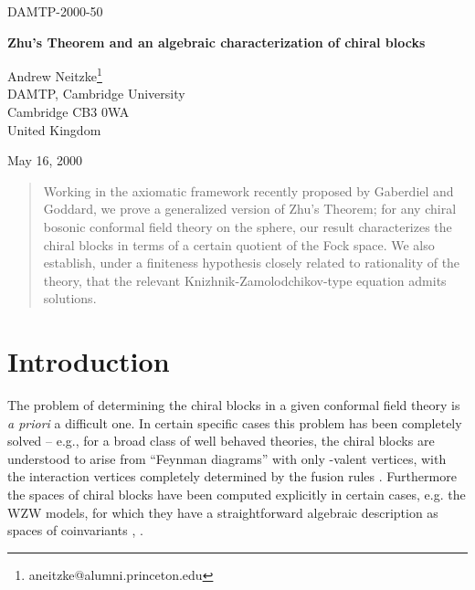 \documentclass[a4paper,12pt]{article}
\providecommand{\ti}[1]{\textit{#1}}
\begin{document}
\begin{flushright}
  DAMTP-2000-50
\end{flushright}

\begin{center} \LARGE{\textbf{Zhu's Theorem and an algebraic characterization of chiral blocks}} \end{center}
\vskip 1.0cm
\begin{center}{\large Andrew Neitzke\footnote{aneitzke@alumni.princeton.edu}\\
DAMTP, Cambridge University\\
Cambridge CB3 0WA\\
United Kingdom\\}\end{center}

\begin{center} May 16, 2000 \end{center}

\vskip 0.8cm


\begin{abstract}

Working in the axiomatic framework recently proposed by Gaberdiel and Goddard, we prove a generalized version
of Zhu's Theorem; for any chiral bosonic conformal field theory on the sphere, our result characterizes 
the chiral blocks in terms of a certain quotient of the Fock space.  We also establish,
under a finiteness hypothesis closely related to rationality of the theory, that the
relevant Knizhnik-Zamolodchikov-type equation admits solutions.

\end{abstract}


\section{Introduction} \label{intro}

The problem of determining the chiral blocks in a given 
conformal field theory is \ti{a priori} a difficult one.  In certain 
specific cases this problem has been
completely solved -- e.g., for a broad class of well behaved theories, the chiral blocks
are understood to arise from ``Feynman diagrams'' with only \coordHE{}-valent vertices, with the
interaction vertices completely determined by the
fusion rules \cite{DFMS}.  Furthermore the spaces of chiral blocks have been computed explicitly
in certain cases, e.g. the WZW models, for which they have a straightforward
algebraic description as spaces of coinvariants \cite{FSV}, \cite{KL}.  
\end{document}
